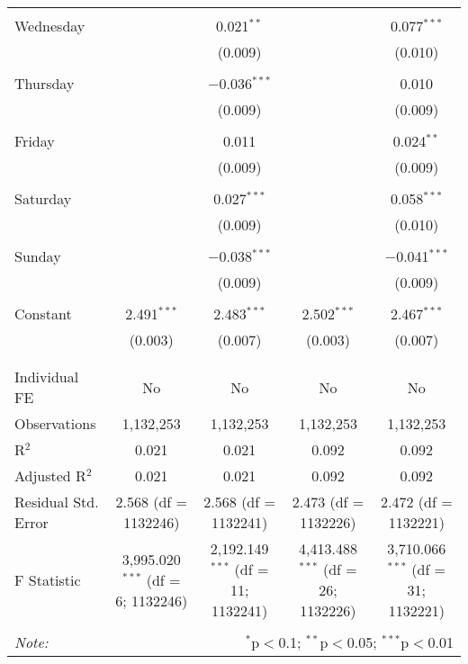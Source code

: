 \documentclass[
]{article}
\begin{document}
\begin{table}[!htbp]
{\begin{tabular}{@{\extracolsep{5pt}}lcccc}
  & & & & \\ 
 Wednesday &  & 0.021$^{**}$ &  & 0.077$^{***}$ \\ 
  &  & (0.009) &  & (0.010) \\ 
  & & & & \\ 
 Thursday &  & $-$0.036$^{***}$ &  & 0.010 \\ 
  &  & (0.009) &  & (0.009) \\ 
  & & & & \\ 
 Friday &  & 0.011 &  & 0.024$^{**}$ \\ 
  &  & (0.009) &  & (0.009) \\ 
  & & & & \\ 
 Saturday &  & 0.027$^{***}$ &  & 0.058$^{***}$ \\ 
  &  & (0.009) &  & (0.010) \\ 
  & & & & \\ 
 Sunday &  & $-$0.038$^{***}$ &  & $-$0.041$^{***}$ \\ 
  &  & (0.009) &  & (0.009) \\ 
  & & & & \\ 
 Constant & 2.491$^{***}$ & 2.483$^{***}$ & 2.502$^{***}$ & 2.467$^{***}$ \\ 
  & (0.003) & (0.007) & (0.003) & (0.007) \\ 
  & & & & \\ 
\hline \\[-1.8ex] 
Individual FE & No & No & No & No \\ 
Observations & 1,132,253 & 1,132,253 & 1,132,253 & 1,132,253 \\ 
R$^{2}$ & 0.021 & 0.021 & 0.092 & 0.092 \\ 
Adjusted R$^{2}$ & 0.021 & 0.021 & 0.092 & 0.092 \\ 
Residual Std. Error & 2.568 (df = 1132246) & 2.568 (df = 1132241) & 2.473 (df = 1132226) & 2.472 (df = 1132221) \\ 
F Statistic & 3,995.020$^{***}$ (df = 6; 1132246) & 2,192.149$^{***}$ (df = 11; 1132241) & 4,413.488$^{***}$ (df = 26; 1132226) & 3,710.066$^{***}$ (df = 31; 1132221) \\ 
\hline 
\hline \\[-1.8ex] 
\textit{Note:}  & \multicolumn{4}{r}{$^{*}$p$<$0.1; $^{**}$p$<$0.05; $^{***}$p$<$0.01} \\ 
\end{tabular}
} 
\end{table} 
\newpage
\end{document}

